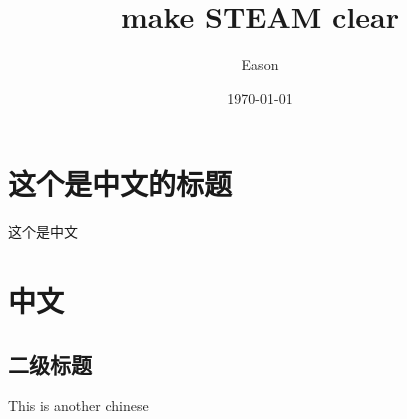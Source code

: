 \documentclass[koma,letterpaper,captions=tableheading,ctex,11pt,listings-sv,microtype,paralist,colorlinks=true,urlcolor=blue]{org-article}
\author{Eason}
\date{\today}
\title{make STEAM clear}
\begin{document}
\section{这个是中文的标题}
\label{sec:org280970c}

这个是中文

\section{中文}
\label{sec:org3ff2844}
\subsection{二级标题}
\label{sec:orgf1b1538}
This is another chinese
\end{document}
